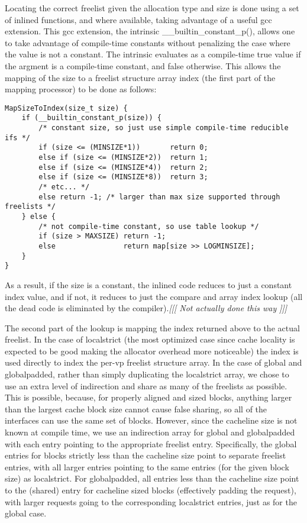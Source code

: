 \documentclass[dvips,11pt]{article}
\newcommand\fixnote[1]{\emph{[[[ #1 ]]]}}
\begin{document}
Locating the correct freelist given the allocation type and size is done
using a set of inlined functions, and where available, taking advantage of
a useful gcc extension.  This gcc extension, the intrinsic
\_\_builtin\_constant\_p(), allows one to take advantage of compile-time
constants without penalizing the case where the value is not a constant.
The intrinsic evaluates as a compile-time true value if the argment is a
compile-time constant, and false otherwise.  This allows the mapping of the
size to a freelist structure array index (the first part of the mapping
processor) to be done as follows: 
{\footnotesize
\begin{verbatim}
MapSizeToIndex(size_t size) {
    if (__builtin_constant_p(size)) {
        /* constant size, so just use simple compile-time reducible ifs */
        if (size <= (MINSIZE*1))       return 0;
        else if (size <= (MINSIZE*2))  return 1;
        else if (size <= (MINSIZE*4))  return 2;
        else if (size <= (MINSIZE*8))  return 3;
        /* etc... */
        else return -1; /* larger than max size supported through freelists */
    } else {
        /* not compile-time constant, so use table lookup */
        if (size > MAXSIZE) return -1;
        else                return map[size >> LOGMINSIZE];
    }
}
\end{verbatim}
} 
As a result, if the size is a constant, the inlined code reduces to
just a constant index value, and if not, it reduces to just the compare and
array index lookup (all the dead code is eliminated by the
compiler).\fixnote{Not actually done this way}

The second part of the lookup is mapping the index returned above to the
actual freelist.  In the case of localstrict (the most optimized case since
cache locality is expected to be good making the allocator overhead more
noticeable) the index is used directly to index the per-vp freelist
structure array.  In the case of global and globalpadded, rather than
simply duplicating the localstrict array, we chose to use an extra level of
indirection and share as many of the freelists as possible.  This is
possible, because, for properly aligned and sized blocks, anything larger
than the largest cache block size cannot cause false sharing, so all of the
interfaces can use the same set of blocks.  However, since the cacheline
size is not known at compile time, we use an indirection array for global
and globalpadded with each entry pointing to the appropriate freelist
entry.  Specifically, the global entries for blocks strictly less than the
cacheline size point to separate freelist entries, with all larger entries
pointing to the same entries (for the given block size) as localstrict.
For globalpadded, all entries less than the cacheline size point to the
(shared) entry for cacheline sized blocks (effectively padding the
request), with larger requests going to the corresponding localstrict
entries, just as for the global case.
\end{document}
